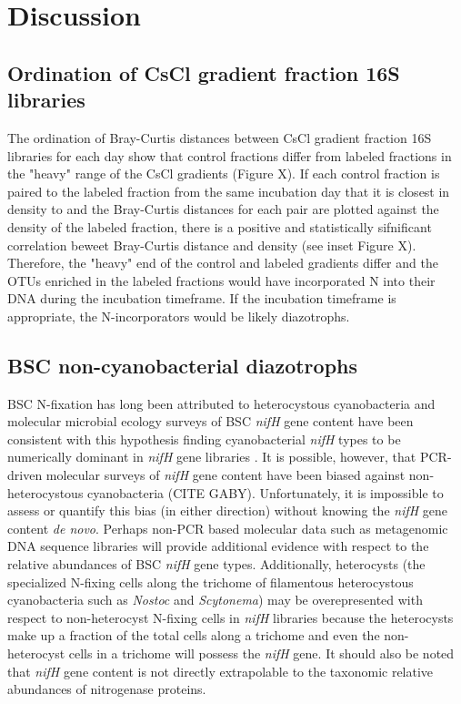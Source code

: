 \section{Discussion}

\subsection{Ordination of CsCl gradient fraction 16S libraries}
The ordination of Bray-Curtis distances between CsCl gradient fraction 16S libraries for each day show that control fractions differ from labeled fractions in the "heavy" range of the CsCl gradients (Figure X). If each control fraction is paired to the labeled fraction from the same incubation day that it is closest in density to and the Bray-Curtis distances for each pair are plotted against the density of the labeled fraction, there is a positive and statistically sifnificant correlation beweet Bray-Curtis distance and density (see inset Figure X). Therefore, the "heavy" end of the control and labeled gradients differ and the OTUs enriched in the labeled fractions would have incorporated N into their DNA during the incubation timeframe. If the incubation timeframe is appropriate, the N-incorporators would be likely diazotrophs.     

\subsection{BSC non-cyanobacterial diazotrophs}
BSC N-fixation has long been attributed to heterocystous cyanobacteria and molecular microbial ecology surveys of BSC \textit{nifH} gene content have been consistent with this hypothesis finding cyanobacterial \textit{nifH} types to be numerically dominant in \textit{nifH} gene libraries \cite{Yeager,14766579,Yeager_2012}. It is possible, however, that PCR-driven molecular surveys of \textit{nifH} gene content have been biased against non-heterocystous cyanobacteria (CITE GABY). Unfortunately, it is impossible to assess or quantify this bias (in either direction) without knowing the \textit{nifH} gene content \textit{de novo}. Perhaps non-PCR based molecular data such as metagenomic DNA sequence libraries will provide additional evidence with respect to the relative abundances of BSC \textit{nifH} gene types. Additionally, heterocysts (the specialized N-fixing cells along the trichome of filamentous heterocystous cyanobacteria such as \textit{Nostoc} and \textit{Scytonema}) may be overepresented with respect to non-heterocyst N-fixing cells in \textit{nifH} libraries because the heterocysts make up a fraction of the total cells along a trichome and even the non-heterocyst cells in a trichome will possess the \textit{nifH} gene. It should also be noted that \textit{nifH} gene content is not directly extrapolable to the taxonomic relative abundances of nitrogenase proteins.

